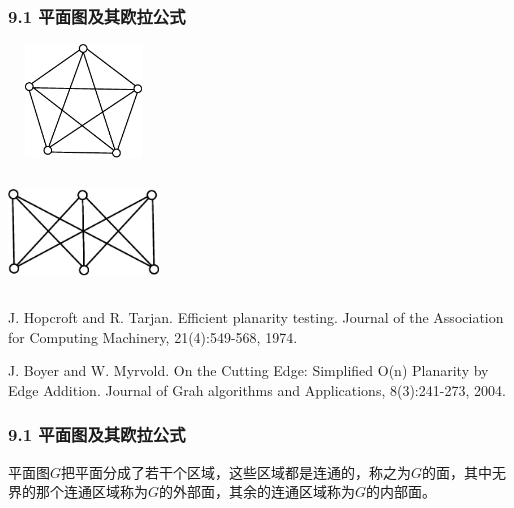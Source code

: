 \documentclass{beamer}
\begin{document}
\begin{CJK}{UTF8}{gbsn}
\begin{frame}
  \frametitle{9.1 平面图及其欧拉公式}
  \begin{minipage}{0.45\linewidth}
\includegraphics[width=4cm,height=3cm]{k5}    
  \end{minipage}
\pause
  \begin{minipage}{0.45\linewidth}
    \includegraphics[width=4cm,height=3cm]{k33}
  \end{minipage}
\pause
  \begin{thebibliography}{99}
  J. Hopcroft and R. Tarjan.
\newblock Efficient planarity testing.
\newblock Journal of the Association for Computing Machinery, 21(4):549-568, 1974.
  \end{thebibliography}
\pause
  \begin{thebibliography}{99}
  J. Boyer and W. Myrvold.
\newblock On the Cutting Edge: Simplified O(n) Planarity by Edge Addition.
\newblock Journal of Grah algorithms and Applications, 8(3):241-273, 2004.
  \end{thebibliography}
\end{frame}
\begin{frame}
  \frametitle{9.1 平面图及其欧拉公式}
  \begin{definition9.1.2}
    平面图$G$把平面分成了若干个区域，这些区域都是连通的，称之为$G$的\alert{面}，其中无界的那个连通区域称为$G$的\alert{外部面}，其余的连通区域称为$G$的\alert{内部面}。
    

\end{definition9.1.2}
\end{frame}
\end{CJK}
\end{document}
